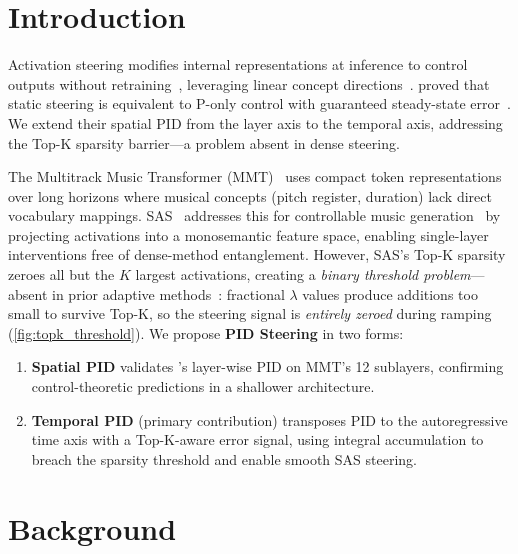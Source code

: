 \documentclass{article}
\theoremstyle{plain}
\begin{document}
\section{Introduction}
\label{sec:intro}

Activation steering modifies internal representations at inference to control outputs without retraining~\cite{turner2024activation, li2023iti, rimsky2024steering}, leveraging linear concept directions~\cite{park2024linear, elhage2022superposition}. \citet{nguyen2026pid} proved that static steering is equivalent to P-only control with guaranteed steady-state error~\cite{astrom1995pid}. We extend their spatial PID from the layer axis to the temporal axis, addressing the Top-K sparsity barrier---a problem absent in dense steering.

The Multitrack Music Transformer (MMT)~\cite{dong2023multitrack} uses compact token representations over long horizons where musical concepts (pitch register, duration) lack direct vocabulary mappings. SAS~\cite{bayat2025sas} addresses this for controllable music generation~\cite{dong2023multitrack, facchiano2024musicgen, panda2024steering, narashiman2025genre} by projecting activations into a monosemantic feature space, enabling single-layer interventions free of dense-method entanglement.
However, SAS's Top-K sparsity zeroes all but the $K$ largest activations, creating a \emph{binary threshold problem}---absent in prior adaptive methods~\cite{vogels2025ids, kang2026directer, li2026svf}: fractional $\lambda$ values produce additions too small to survive Top-K, so the steering signal is \emph{entirely zeroed} during ramping (\cref{fig:topk_threshold}). We propose \textbf{PID Steering} in two forms:
\begin{enumerate}
    \item \textbf{Spatial PID} validates \citet{nguyen2026pid}'s layer-wise PID on MMT's 12 sublayers, confirming control-theoretic predictions in a shallower architecture.
    \item \textbf{Temporal PID} (primary contribution) transposes PID to the autoregressive time axis with a Top-K-aware error signal, using integral accumulation to breach the sparsity threshold and enable smooth SAS steering.
\end{enumerate}

\section{Background}
\label{sec:background}
\end{document}
